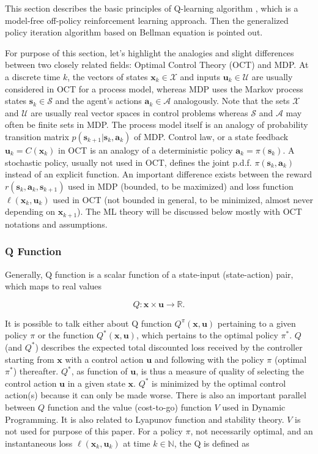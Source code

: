\documentclass{ifacconf}
\begin{document}
This section describes the basic principles of Q-learning algorithm \citep{ecc19ref:Sutton_Reinforcement_Learning}, which is a model-free off-policy reinforcement learning approach. Then the generalized policy iteration algorithm based on Bellman equation is pointed out. 

For purpose of this section, let's highlight the analogies and slight differences between two closely related fields: Optimal Control Theory (OCT) and MDP. At a discrete time $k$, the vectors of states $\mathbf{x}_{k}\in\mathcal{X}$ and inputs $\mathbf{u}_{k}\in\mathcal{U}$ are usually considered in OCT for a process model, whereas MDP uses the Markov process states $\mathbf{s}_{k}\in\mathcal{S}$ and the agent's actions $\mathbf{a}_{k}\in\mathcal{A}$ analogously. Note that the sets $\mathcal{X}$ and $\mathcal{U}$ are usually real vector spaces in control problems whereas $\mathcal{S}$ and $\mathcal{A}$ may often be finite sets in MDP. The process model itself is an analogy of probability transition matrix $p(\mathbf{s}_{k+1}|\mathbf{s}_{k},\mathbf{a}_{k})$ of MDP. Control law, or a state feedback $\mathbf{u}_{k}=C(\mathbf{x}_{k})$ in OCT is an analogy of a deterministic policy $\mathbf{a}_{k}=\pi(\mathbf{s}_{k})$. A stochastic policy, usually not used in OCT, defines the joint p.d.f. $\pi(\mathbf{s}_{k},\mathbf{a}_{k})$ instead of an explicit function. An important difference exists between the reward $r(\mathbf{s}_{k},\mathbf{a}_{k},\mathbf{s}_{k+1})$ used in MDP (bounded, to be maximized) and loss function $\ell(\mathbf{x}_{k},\mathbf{u}_{k})$ used in OCT (not bounded in general, to be minimized, almost never depending on $\mathbf{x}_{k+1}$). The ML theory will be discussed below mostly with OCT notations and assumptions.

\subsubsection{Q Function}

Generally, Q function is a scalar function of a state-input (state-action) pair, which maps to real values 

\[
Q:\mathbf{\mathbf{x\times}u}\rightarrow\mathbb{R}.
\]

It is possible to talk either about Q function $Q^{\pi}(\mathbf{x},\mathbf{u})$
pertaining to a given policy $\pi$ or the function $Q^{*}(\mathbf{x},\mathbf{u})$,
which pertains to the optimal policy $\pi^{*}$. $Q$ (and $Q^{*}$)
describes the expected total discounted loss received by the controller
starting from $\mathbf{x}$ with a control action $\mathbf{u}$ and
following with the policy $\pi$ (optimal $\pi^{*}$) thereafter.
$Q^{*}$, as function of $\mathbf{u}$, is thus a measure of quality
of selecting the control action $\mathbf{u}$ in a given state $\mathbf{x}$.
$Q^{*}$ is minimized by the optimal control action(s) because it
can only be made worse. There is also an important parallel between
$Q$ function and the value (cost-to-go) function $V$ used in Dynamic
Programming. It is also related to Lyapunov function and stability
theory. $V$ is not used for purpose of this paper. For a policy $\pi$,
not necessarily optimal, and an instantaneous loss $\ell(\mathbf{x}_{k},\mathbf{u}_{k})$
at time $k\in\mathbb{N}$, the Q is defined as
\end{document}
